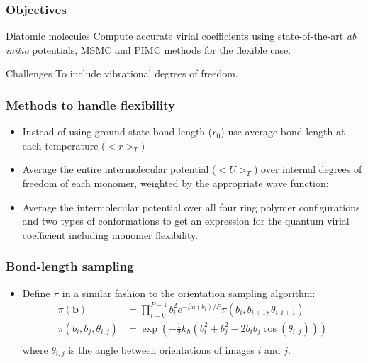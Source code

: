 \documentclass[xcolor=svgnames]{beamer}
\DeclareRobustCommand{\abinitio}[0]{\emph{ab initio}}
\begin{document}
        \begin{frame}
            \frametitle{Objectives}
            \begin{block}{Diatomic molecules}
                Compute accurate virial coefficients using state-of-the-art \abinitio{} potentials, MSMC and PIMC methods for the flexible case.
            \end{block}
                \begin{alertblock}{Challenges}
                    To include vibrational degrees of freedom.
                \end{alertblock}
        \end{frame}
        \begin{frame}
            \frametitle{Methods to handle flexibility}
            \begin{itemize}
                \justifying
                \item Instead of using ground state bond length ($r_0$) use average bond length at each temperature ($< r >_T$)
                \item Average the entire intermolecular potential ($<U>_T$) over internal degrees of freedom of each monomer, weighted by the appropriate wave function:
                \item Average the intermolecular potential over all four ring polymer configurations and two types of conformations to get an expression for the quantum virial coefficient including monomer flexibility.
            \end{itemize}
        \end{frame}
        \begin{frame}
            \frametitle{Bond-length sampling}
            \begin{itemize}
                \item Define $\pi$ in a similar fashion to the orientation sampling algorithm:
                \begin{equation*}
                    \begin{aligned}
                        \pi(\mathbf{b}) &= \displaystyle\prod\limits_{i=0}^{P-1} b_i^2 e^{-\beta u(b_i)/P} \pi(b_i,b_{i+1},\theta_{i,i+1}) \\
                        \pi(b_i,b_j,\theta_{i,j}) &= \exp\left(-\frac{1}{2}  k_h  \left( b_i^2 + b_j^2 - 2  b_i  b_j  \cos (\theta_{i,j}) \right)\right)\\
                    \end{aligned}
                \end{equation*}
                where $\theta_{i,j}$ is the angle between orientations of images $i$ and $j$.
            \end{itemize}
        \end{frame}
\end{document}

